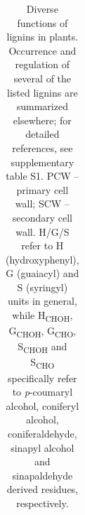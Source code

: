 \documentclass[journal=,manuscript=]{achemso}
\begin{document}
\scriptsize


\begin{longtable}[]{@{}
  >{\raggedright\arraybackslash}p{}
  >{\raggedright\arraybackslash}p{}
  >{\raggedright\arraybackslash}p{}
  >{\raggedright\arraybackslash}p{}
  >{\raggedright\arraybackslash}p{}@{}}

\caption{\label{tbl-locations}Diverse functions of lignins in plants.
Occurrence and regulation of several of the listed lignins are
summarized elsewhere;\citep{Chantreau2022} for detailed references, see
supplementary table S1. PCW -- primary cell wall; SCW -- secondary cell
wall. H/G/S refer to H (hydroxyphenyl), G (guaiacyl) and S (syringyl)
units in general, while H\textsubscript{CHOH}, G\textsubscript{CHOH},
G\textsubscript{CHO}, S\textsubscript{CHOH} and S\textsubscript{CHO}
specifically refer to \emph{p}-coumaryl alcohol, coniferyl alcohol,
coniferaldehyde, sinapyl alcohol and sinapaldehyde derived residues,
respectively.}

\tabularnewline


\end{longtable}
\end{document}
